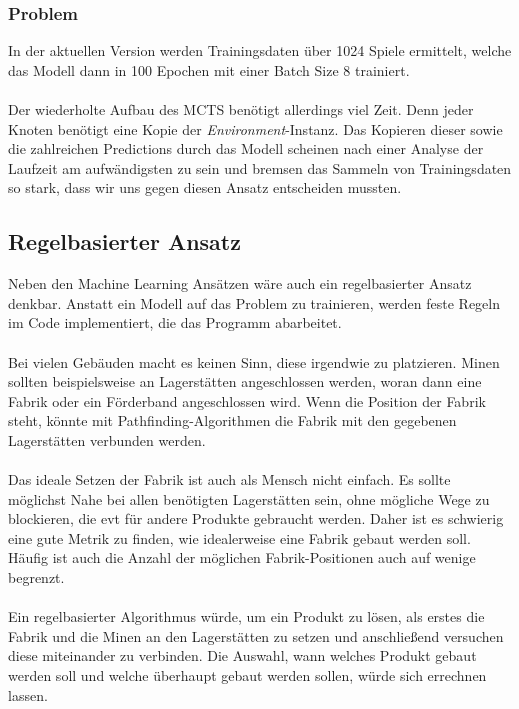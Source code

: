\subsubsection*{Problem}
In der aktuellen Version werden Trainingsdaten über 1024 Spiele ermittelt, welche das Modell dann in 100 Epochen mit einer Batch Size 8 trainiert.
\\\\
Der wiederholte Aufbau des MCTS benötigt allerdings viel Zeit. Denn jeder Knoten benötigt eine Kopie der \textit{Environment}-Instanz. Das Kopieren dieser sowie die zahlreichen Predictions durch das Modell scheinen nach einer Analyse der Laufzeit am aufwändigsten zu sein und bremsen das Sammeln von Trainingsdaten so stark, dass wir uns gegen diesen Ansatz entscheiden mussten.

\subsection{Regelbasierter Ansatz}

Neben den Machine Learning Ansätzen wäre auch ein regelbasierter Ansatz denkbar. Anstatt ein Modell auf das Problem zu trainieren, werden feste Regeln im Code implementiert, die das Programm abarbeitet.
\\\\
Bei vielen Gebäuden macht es keinen Sinn, diese irgendwie zu platzieren. Minen sollten beispielsweise an Lagerstätten angeschlossen werden, woran dann eine Fabrik oder ein Förderband angeschlossen wird. Wenn die Position der Fabrik steht, könnte mit Pathfinding-Algorithmen die Fabrik mit den gegebenen Lagerstätten verbunden werden.
\\\\
Das ideale Setzen der Fabrik ist auch als Mensch nicht einfach. Es sollte möglichst Nahe bei allen benötigten Lagerstätten sein, ohne mögliche Wege zu blockieren, die evt für andere Produkte gebraucht werden. Daher ist es schwierig eine gute Metrik zu finden, wie idealerweise eine Fabrik gebaut werden soll. Häufig ist auch die Anzahl der möglichen Fabrik-Positionen auch auf wenige begrenzt.
\\\\
Ein regelbasierter Algorithmus würde, um ein Produkt zu lösen, als erstes die Fabrik und die Minen an den Lagerstätten zu setzen und anschließend versuchen diese miteinander zu verbinden. 
Die Auswahl, wann welches Produkt gebaut werden soll und welche überhaupt gebaut werden sollen, würde sich errechnen lassen.  

